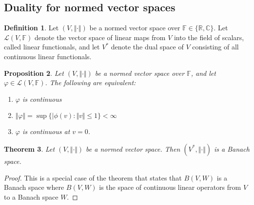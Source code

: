 \documentclass[11pt]{amsart}
\newtheorem{theorem}{Theorem}[section]
\newtheorem{proposition}[theorem]{Proposition}
\theoremstyle{definition}
\newtheorem{definition}[theorem]{Definition}
\numberwithin{equation}{section}
\begin{document}
\subsection{Duality for normed vector spaces}
\begin{definition}
    Let $(V,\Vert\cdot\Vert)$ be a normed vector space over $\mathbb F\in\{\mathbb R,\mathbb C\}$. Let $\mathcal L(V,\mathbb F)$ denote the vector space of linear maps from $V$ into the field of scalars, called linear functionals, and let $V^*$ denote the dual space of $V$ consisting of all continuous linear functionals.
\end{definition}
\begin{proposition}
    Let $(V,\Vert\cdot\Vert)$ be a normed vector space over $\mathbb F$, and let $\varphi\in\mathcal L(V,\mathbb F)$. The following are equivalent:
    \begin{enumerate}
        \item [(i)] $\varphi$ is continuous
        \item [(ii)] $\Vert \varphi\Vert=\sup\{|\phi(v):\Vert v\Vert\le 1\}<\infty$
        \item [(iii)] $\varphi$ is continuous at $v=0$.
    \end{enumerate}
\end{proposition}
\begin{theorem}
    Let $(V,\Vert\cdot\Vert)$ be a normed vector space. Then $(V^*,\Vert\cdot\Vert)$ is a Banach space.
\end{theorem}
\begin{proof}
    This is a special case of the theorem that states that $B(V,W)$ is a Banach space where $B(V,W)$ is the space of continuous linear operators from $V$ to a Banach space $W$.
\end{proof}
\end{document}
